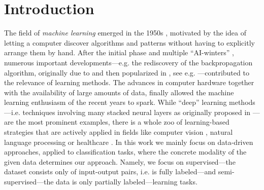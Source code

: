 \chapter{Introduction}
%
%
The field of \textit{machine learning} emerged in the 1950s \cite{samuel1959some, rosenblatt1958perceptron}, motivated by the idea of letting a computer discover algorithms and patterns without having to explicitly arrange them by hand. After the initial phase and multiple \enquote{AI-winters} \cite{steele1996evolution}, numerous important developments---e.g. the rediscovery of the backpropagation algorithm, originally due to \cite{kelley1960gradient,rosenblatt1962principles} and then popularized in \cite{rumelhart1986learning}, see e.g. \cite{schmidhuber2022annotated}---contributed to the relevance of learning methods. The advances in computer hardware together with the availability of large amounts of data, finally allowed the machine learning enthusiasm of the recent years to spark. While \enquote{deep} learning methods---i.e. techniques involving many stacked neural layers as originally proposed in \cite{rosenblatt1958perceptron}---are the most prominent examples, there is a whole zoo of learning-based strategies that are actively applied in fields like computer vision \cite{chai2021deep}, natural language processing \cite{khurana2023natural} or healthcare \cite{shehab2022machine}. In this work we mainly focus on data-driven approaches, applied to classification tasks, where the concrete modality of the given data determines our approach. Namely, we focus on supervised---the dataset consists only of input-output pairs, i.e. is fully labeled---and semi-supervised---the data is only partially labeled---learning tasks.

